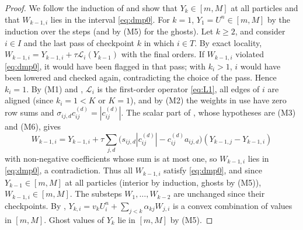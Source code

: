 \documentclass[11pt,a4paper]{article}
\theoremstyle{plain}
\theoremstyle{definition}
\theoremstyle{remark}
\numberwithin{equation}{section}
\newcommand{\Lop}{\mathcal{L}}
\newcommand{\A}[1]{\cite[#1]{Addendum}}
\begin{document}
\begin{proof}
We follow the induction of \A{Thm.~6.3} and show that $Y_k\in[m,M]$ at all particles and that $W_{k-1,i}$ lies in the interval \eqref{eq:dmp0}. For $k=1$, $Y_1=U^n\in[m,M]$ by the induction over the steps (and by (M5) for the ghosts). Let $k\ge2$, and consider $i\in I$ and the last pass of checkpoint $k$ in which $i\in T$. By exact locality, $W_{k-1,i}=Y_{k-1,i}+\tau\Lop_i(Y_{k-1})$ with the final orders. If $W_{k-1,i}$ violated \eqref{eq:dmp0}, it would have been flagged in that pass; with $k_i>1$, $i$ would have been lowered and checked again, contradicting the choice of the pass. Hence $k_i=1$. By (M1) and \A{Prop.~5.6}, $\Lop_i$ is the first-order operator \eqref{eq:L1}, all edges of $i$ are aligned (since $k_i=1<K$ or $K=1$), and by (M2) the weights in use have zero row sums and $\sigma_{ij,d}c^{(d)}_{ij}=|c^{(d)}_{ij}|$. The scalar part of \A{Cor.~5.3}, whose hypotheses are (M3) and (M6), gives
\[
W_{k-1,i}=Y_{k-1,i}+\tau\sum_{j,d}\big(s_{ij,d}|c^{(d)}_{ij}|-c^{(d)}_{ij}a_{ij,d}\big)(Y_{k-1,j}-Y_{k-1,i})
\]
with non-negative coefficients whose sum is at most one, so $W_{k-1,i}$ lies in \eqref{eq:dmp0}, a contradiction. Thus all $W_{k-1,i}$ satisfy \eqref{eq:dmp0}, and since $Y_{k-1}\in[m,M]$ at all particles (interior by induction, ghosts by (M5)), $W_{k-1,i}\in[m,M]$. The substeps $W_1,\dots,W_{k-2}$ are unchanged since their checkpoints. By \A{Lem.~6.1}, $Y_{k,i}=v_kU^n_i+\sum_{j<k}\alpha_{kj}W_{j,i}$ is a convex combination of values in $[m,M]$. Ghost values of $Y_k$ lie in $[m,M]$ by (M5).
\end{proof}
\end{document}
